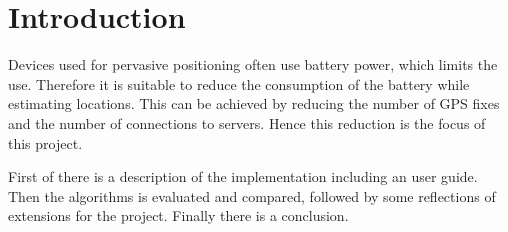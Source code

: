 \section{Introduction}
Devices used for pervasive positioning often use battery power, which limits the use. Therefore it is suitable to reduce the consumption of the battery while estimating locations. This can be achieved by reducing the number of GPS fixes and the number of connections to servers. Hence this reduction is the focus of this project.

First of there is a description of the implementation including an user guide. Then the algorithms is evaluated and compared, followed by some reflections of extensions for the project. Finally there is a conclusion.